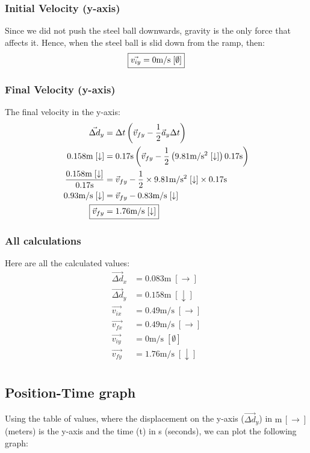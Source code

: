 \documentclass[a4paper,12pt]{article}
\begin{document}
	\subsubsection{Initial Velocity (y-axis)}
	Since we did not push the steel ball downwards, gravity is the only force that affects it. Hence, when the steel ball is slid down from the ramp, then:
	\begin{align*}
		\Aboxed{\vec{v_{iy}}&=0\text{m}/\text{s}\;[\emptyset]}\\
	\end{align*}
	\subsubsection{Final Velocity (y-axis)}
	The final velocity in the y-axis:
	\begin{align*}
		\vec{\Delta d}_y&=\Delta t\left(\vec{v}_{fy}-\frac{1}{2}\vec{a}_y\Delta t\right)\\
		0.158\text{m}\;[\downarrow]&=0.17\text{s}\left(\vec{v}_{fy}-\frac{1}{2}\left(9.81\text{m}/\text{s}^2\;[\downarrow]\right)0.17\text{s}\right)\\
		\frac{0.158\text{m}\;[\downarrow]}{0.17\text{s}}&=\vec{v}_{fy}-\frac{1}{2}\times9.81\text{m}/\text{s}^2\;[\downarrow]\times0.17\text{s}\\
		0.93\text{m}/\text{s}\;[\downarrow]&=\vec{v}_{fy}-0.83\text{m}/\text{s}\;[\downarrow]\\
		\Aboxed{\vec{v}_{fy}&=1.76\text{m}/\text{s}\;[\downarrow]}
	\end{align*}
	\subsubsection{All calculations}
	Here are all the calculated values:
	\begin{align*}
		\vec{\Delta d}_x&=0.083\text{m}\; [\rightarrow]\\
		\vec{\Delta d}_y&=0.158\text{m}\; [\downarrow]\\
		\vec{v_{ix}}&=0.49\text{m}/\text{s}\;[\rightarrow]\\
		\vec{v_{fx}}&=0.49\text{m}/\text{s}\;[\rightarrow]\\
		\vec{v_{iy}}&=0\text{m}/\text{s}\;[\emptyset]\\
		\vec{v_{fy}}&=1.76\text{m}/\text{s}\;[\downarrow]\\
	\end{align*}
	\subsection{Position-Time graph}
	Using the table of values, where the displacement on the y-axis ($\vec{\Delta d}_y$) in $\text{m} \,[\rightarrow]$ (meters) is the y-axis and the time (t) in s (seconds), we can plot the following graph:
	
\end{document}
